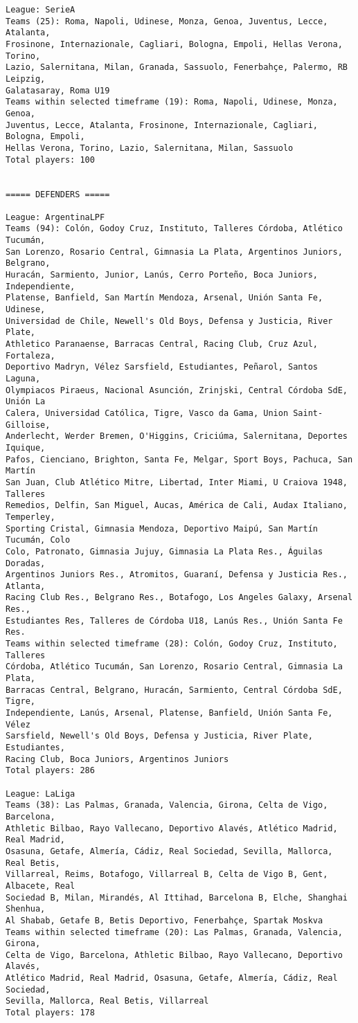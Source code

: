 \documentclass[11pt]{article}
\begin{document}
\begin{Verbatim}[commandchars=\\\{\}]
League: SerieA
Teams (25): Roma, Napoli, Udinese, Monza, Genoa, Juventus, Lecce, Atalanta,
Frosinone, Internazionale, Cagliari, Bologna, Empoli, Hellas Verona, Torino,
Lazio, Salernitana, Milan, Granada, Sassuolo, Fenerbahçe, Palermo, RB Leipzig,
Galatasaray, Roma U19
Teams within selected timeframe (19): Roma, Napoli, Udinese, Monza, Genoa,
Juventus, Lecce, Atalanta, Frosinone, Internazionale, Cagliari, Bologna, Empoli,
Hellas Verona, Torino, Lazio, Salernitana, Milan, Sassuolo
Total players: 100


===== DEFENDERS =====

League: ArgentinaLPF
Teams (94): Colón, Godoy Cruz, Instituto, Talleres Córdoba, Atlético Tucumán,
San Lorenzo, Rosario Central, Gimnasia La Plata, Argentinos Juniors, Belgrano,
Huracán, Sarmiento, Junior, Lanús, Cerro Porteño, Boca Juniors, Independiente,
Platense, Banfield, San Martín Mendoza, Arsenal, Unión Santa Fe, Udinese,
Universidad de Chile, Newell's Old Boys, Defensa y Justicia, River Plate,
Athletico Paranaense, Barracas Central, Racing Club, Cruz Azul, Fortaleza,
Deportivo Madryn, Vélez Sarsfield, Estudiantes, Peñarol, Santos Laguna,
Olympiacos Piraeus, Nacional Asunción, Zrinjski, Central Córdoba SdE, Unión La
Calera, Universidad Católica, Tigre, Vasco da Gama, Union Saint-Gilloise,
Anderlecht, Werder Bremen, O'Higgins, Criciúma, Salernitana, Deportes Iquique,
Pafos, Cienciano, Brighton, Santa Fe, Melgar, Sport Boys, Pachuca, San Martín
San Juan, Club Atlético Mitre, Libertad, Inter Miami, U Craiova 1948, Talleres
Remedios, Delfin, San Miguel, Aucas, América de Cali, Audax Italiano, Temperley,
Sporting Cristal, Gimnasia Mendoza, Deportivo Maipú, San Martín Tucumán, Colo
Colo, Patronato, Gimnasia Jujuy, Gimnasia La Plata Res., Águilas Doradas,
Argentinos Juniors Res., Atromitos, Guaraní, Defensa y Justicia Res., Atlanta,
Racing Club Res., Belgrano Res., Botafogo, Los Angeles Galaxy, Arsenal Res.,
Estudiantes Res, Talleres de Córdoba U18, Lanús Res., Unión Santa Fe Res.
Teams within selected timeframe (28): Colón, Godoy Cruz, Instituto, Talleres
Córdoba, Atlético Tucumán, San Lorenzo, Rosario Central, Gimnasia La Plata,
Barracas Central, Belgrano, Huracán, Sarmiento, Central Córdoba SdE, Tigre,
Independiente, Lanús, Arsenal, Platense, Banfield, Unión Santa Fe, Vélez
Sarsfield, Newell's Old Boys, Defensa y Justicia, River Plate, Estudiantes,
Racing Club, Boca Juniors, Argentinos Juniors
Total players: 286

League: LaLiga
Teams (38): Las Palmas, Granada, Valencia, Girona, Celta de Vigo, Barcelona,
Athletic Bilbao, Rayo Vallecano, Deportivo Alavés, Atlético Madrid, Real Madrid,
Osasuna, Getafe, Almería, Cádiz, Real Sociedad, Sevilla, Mallorca, Real Betis,
Villarreal, Reims, Botafogo, Villarreal B, Celta de Vigo B, Gent, Albacete, Real
Sociedad B, Milan, Mirandés, Al Ittihad, Barcelona B, Elche, Shanghai Shenhua,
Al Shabab, Getafe B, Betis Deportivo, Fenerbahçe, Spartak Moskva
Teams within selected timeframe (20): Las Palmas, Granada, Valencia, Girona,
Celta de Vigo, Barcelona, Athletic Bilbao, Rayo Vallecano, Deportivo Alavés,
Atlético Madrid, Real Madrid, Osasuna, Getafe, Almería, Cádiz, Real Sociedad,
Sevilla, Mallorca, Real Betis, Villarreal
Total players: 178


\end{Verbatim}
\end{document}
